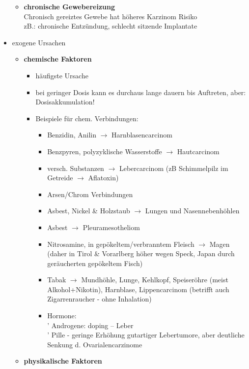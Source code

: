 \begin{itemize}
\begin{itemize}
					\item	\textbf{chronische Gewebereizung} \\
						Chronisch gereiztes Gewebe hat höheres Karzinom Risiko\\
						zB.: chronische Entzündung, schlecht sitzende Implantate 
				\end{itemize}
			\item exogene Ursachen
				\begin{itemize}
					\item \textbf{chemische Faktoren}
						\begin{itemize}
							\item häufigste Ursache
							\item bei geringer Dosis kann es durchaus lange dauern bis Auftreten, aber: Dosisakkumulation!
							\item Beispiele für chem. Verbindungen:
								\begin{itemize}
									\item Benzidin, Anilin $\rightarrow$ Harnblasencarcinom
									\item Benzpyren, polyzyklische Wasserstoffe $\rightarrow$ Hautcarcinom
									\item versch. Substanzen $\rightarrow$ Lebercarcinom
										(zB Schimmelpilz im Getreide $\rightarrow$ Aflatoxin) 
									\item Arsen/Chrom Verbindungen
									\item Asbest, Nickel \& Holzstaub $\rightarrow$ Lungen und Nasennebenhöhlen
									\item Asbest $\rightarrow$ Pleuramesotheliom
									\item Nitrosamine, in gepökeltem/verbranntem Fleisch $\rightarrow$ Magen\\
										(daher in Tirol \& Vorarlberg höher wegen Speck, Japan durch geräucherten gepökeltem Fisch)
									\item Tabak $\rightarrow$ Mundhöhle, Lunge, Kehlkopf, Speiseröhre (meist Alkohol+Nikotin), Harnblase, Lippencarcinom (betrifft auch Zigarrenraucher - ohne Inhalation)
									\item Hormone:\\
										' Androgene: doping – Leber\\
										' Pille - geringe Erhöhung gutartiger Lebertumore, aber deutliche Senkung d. Ovarialencarzinome
								\end{itemize}
						\end{itemize}
					\pagebreak
					\item \textbf{physikalische Faktoren}

\end{itemize}
\end{itemize}
